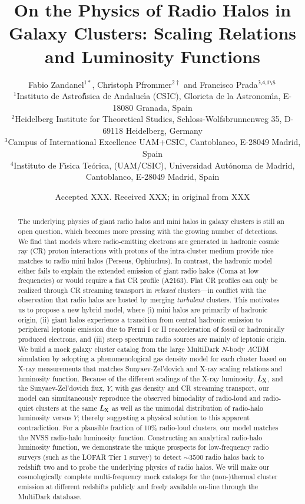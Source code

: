 \documentclass[useAMS,usenatbib]{mn2e}
\title[On the Physics of Radio Halos in Galaxy Clusters]{On the Physics of Radio Halos in Galaxy Clusters: Scaling Relations and Luminosity Functions}
\author[F. Zandanel, C. Pfrommer and F. Prada]{
Fabio Zandanel$^{1 *}$, Christoph Pfrommer$^{2 \dagger}$ and Francisco Prada$^{3,4,1 \S}$\\
$^{1}$Instituto de Astrof\'{\i}sica de Andaluc\'{\i}a (CSIC), Glorieta de la Astronom\'{\i}a, E-18080 Granada, Spain\\
$^{2}$Heidelberg Institute for Theoretical Studies, Schloss-Wolfsbrunnenweg 35, D-69118 Heidelberg, Germany\\
$^{3}$Campus of International Excellence UAM+CSIC, Cantoblanco, E-28049 Madrid, Spain\\
$^{4}$Instituto de F\'{\i}sica Te\'orica, (UAM/CSIC), Universidad Aut\'onoma de Madrid, Cantoblanco, E-28049 Madrid, Spain}
\begin{document}
\date{Accepted XXX. Received XXX; in original from XXX}

\pagerange{\pageref{firstpage}--\pageref{lastpage}} 

\maketitle

\label{firstpage}

\begin{abstract}
  The underlying physics of giant radio halos and mini halos in galaxy clusters
  is still an open question, which becomes more pressing with the growing number
  of detections. We find that models where radio-emitting electrons are
  generated in hadronic cosmic ray (CR) proton interactions with protons of the
  intra-cluster medium provide nice matches to radio mini halos (Perseus,
  Ophiuchus). In contrast, the hadronic model either fails to explain the
  extended emission of giant radio halos (Coma at low frequencies) or would
  require a flat CR profile (A2163). Flat CR profiles can only be realized
  through CR streaming transport in {\em relaxed} clusters---in conflict with
  the observation that radio halos are hosted by merging {\em turbulent}
  clusters. This motivates us to propose a new hybrid model, where (i) mini
  halos are primarily of hadronic origin, (ii) giant halos experience a
  transition from central hadronic emission to peripheral leptonic emission due
  to Fermi I or II reacceleration of fossil or hadronically produced electrons,
  and (iii) steep spectrum radio sources are mainly of leptonic origin. We build
  a mock galaxy cluster catalog from the large MultiDark $N$-body $\Lambda$CDM
  simulation by adopting a phenomenological gas density model for each cluster
  based on X-ray measurements that matches Sunyaev-Zel'dovich and X-ray scaling
  relations and luminosity function. Because of the different scalings of the
  X-ray luminosity, $L_{{\mathrm{X}}}$, and the Sunyaev-Zel'dovich flux, $Y$, with
  gas density and CR streaming transport, our model can simultaneously reproduce
  the observed bimodality of radio-loud and radio-quiet clusters at the same
  $L_{{\mathrm{X}}}$ as well as the unimodal distribution of radio-halo luminosity
  versus $Y$; thereby suggesting a physical solution to this apparent
  contradiction. For a plausible fraction of 10\% radio-loud clusters, our model
  matches the NVSS radio-halo luminosity function. Constructing an analytical
  radio-halo luminosity function, we demonstrate the unique prospects for
  low-frequency radio surveys (such as the LOFAR Tier 1 survey) to detect
  $\sim3500$ radio halos back to redshift two and to probe the underlying
  physics of radio halos.  We will make our cosmologically complete
  multi-frequency mock catalogs for the (non-)thermal cluster emission at
  different redshifts publicly and freely available on-line through the
  MultiDark database.
\end{abstract}
\end{document}
